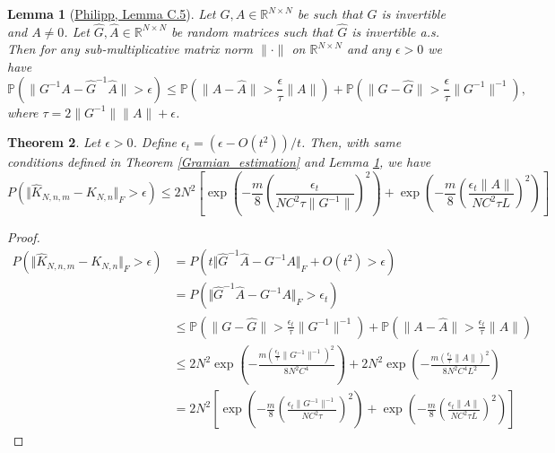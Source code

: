 \documentclass{article}[11]
\newtheorem{theorem}{Theorem}
\newtheorem{lemma}[theorem]{Lemma}
\begin{document}
	
	\begin{lemma}[\href{https://arxiv.org/pdf/2402.02494}{Philipp, Lemma C.5}]\label{Philipp}
		Let $G, A \in \mathbb{R}^{N \times N}$ be such that $G$ is invertible and $A \neq 0$. Let $\widehat{G}, \widehat{A} \in \mathbb{R}^{N \times N}$ be random matrices such that $\widehat{G}$ is invertible a.s. Then for any sub-multiplicative matrix norm $\|\cdot\|$ on $\mathbb{R}^{N \times N}$ and any $\epsilon > 0$ we have
		\[
		\mathbb{P}\left(\|G^{-1}A - \widehat{G}^{-1}\widehat{A}\| > \epsilon \right) \leq \mathbb{P}\left(\|A - \widehat{A}\| > \frac{\epsilon}{\tau} \|A\|\right) + \mathbb{P}\left(\|G - \widehat{G}\| > \frac{\epsilon}{\tau} \|G^{-1}\|^{-1}\right),
		\]
		where $\tau = 2\|G^{-1}\|\|A\| + \epsilon$.
	\end{lemma}
	
	\begin{theorem}
		Let $\epsilon>0$. Define $\epsilon_t = \left(\epsilon - O(t^2)\right)/t$. Then, with same conditions defined in Theorem \ref{Gramian_estimation} and Lemma \ref{Philipp}, we have
		\begin{equation*}
			P\left(\Vert \widehat{K}_{N,n,m} - K_{N,n} \Vert_F > \epsilon \right) \leq 2N^2 \left[ \exp \left( -\frac{m}{8} \left(\frac{\epsilon_t}{N C^2 \tau \|G^{-1}\|}\right)^2 \right) + \exp \left( -\frac{m}{8} \left(\frac{\epsilon_t \|A\|}{N C^2 \tau L}\right)^2 \right) \right]
		\end{equation*}  
	\end{theorem}
	\begin{proof}
		\begin{align*}
			P\left(\Vert \widehat{K}_{N,n,m} - K_{N,n} \Vert_F > \epsilon \right) 
			&= P\left( t\Vert \widehat{G}^{-1} \widehat{A} - G^{-1}A \Vert_F + O(t^2) > \epsilon \right) \\
			&= P\left( \Vert \widehat{G}^{-1} \widehat{A} - G^{-1}A \Vert_F  > \epsilon_t \right) \\
			&\leq \mathbb{P}\left(\|G - \widehat{G}\| > \frac{\epsilon_t}{\tau} \|G^{-1}\|^{-1} \right) + \mathbb{P}\left(\|A - \widehat{A}\| > \frac{\epsilon_t}{\tau} \|A\| \right) \\
			&\leq 2N^2 \exp \left( -\frac{m (\frac{\epsilon_t}{\tau} \|G^{-1}\|^{-1})^2}{8 N^2 C^4} \right) + 2N^2 \exp \left( -\frac{m (\frac{\epsilon_t}{\tau} \|A\|)^2}{8 N^2 C^4 L^2} \right) \\
			&= 2N^2 \left[ \exp \left( -\frac{m}{8} \left(\frac{\epsilon_t \|G^{-1}\|^{-1}}{N C^2 \tau}\right)^2 \right) + \exp \left( -\frac{m}{8} \left(\frac{\epsilon_t \|A\|}{N C^2 \tau L}\right)^2 \right) \right]
		\end{align*}  
	\end{proof}
	
\end{document}
